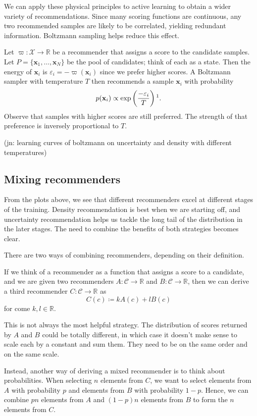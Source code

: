 \documentclass[11pt,twoside]{report}
\newcommand\bbR{\mathbb{R}}
\newcommand\bx{\mathbf{x}}
\newcommand\cC{\mathcal{C}}
\newcommand\cX{\mathcal{X}}
\newcommand\jn[1]{{\color{red}(jn: #1)}}
\begin{document}
We can apply these physical principles to active learning to obtain a wider variety of recommendations. Since many scoring functions are continuous, any two recommended samples are likely to be correlated, yielding redundant information. Boltzmann sampling helps reduce this effect.

Let $\varpi : \cX \to \bbR$ be a recommender that assigns a score to the candidate samples. Let $P = \{\bx_1, \dots, \bx_N\}$ be the pool of candidates; think of each as a state. Then the energy of $\bx_i$ is $\varepsilon_i = -\varpi(\bx_i)$ since we prefer higher scores. A Boltzmann sampler with temperature $T$ then recommends a sample $\bx_i$ with probability \[
  p(\bx_i) \propto \exp\left(\frac{-\varepsilon_i}{T}\right) \text{\footnotemark}.
\] Observe that samples with higher scores are still preferred. The strength of that preference is inversely proportional to $T$.

\jn{learning curves of boltzmann on uncertainty and density with different temperatures}

\subsection{Mixing recommenders}

From the plots above, we see that different recommenders excel at different stages of the training. Density recommendation is best when we are starting off, and uncertainty recommendation helps us tackle the long tail of the distribution in the later stages. The need to combine the benefits of both strategies becomes clear.

There are two ways of combining recommenders, depending on their definition.

If we think of a recommender as a function that assigns a score to a candidate, and we are given two recommenders $A : \cC \to \bbR$ and $B : \cC \to \bbR$, then we can derive a third recommender $C : \cC \to \bbR$ as \[
    C(c) \coloneqq kA(c) + lB(c)
\] for come $k, l \in \bbR$.

This is not always the most helpful strategy. The distribution of scores returned by $A$ and $B$ could be totally different, in which case it doesn't make sense to scale each by a constant and sum them. They need to be on the same order and on the same scale.

Instead, another way of deriving a mixed recommender is to think about probabilities. When selecting $n$ elements from $C$, we want to select elements from $A$ with probability $p$ and elements from $B$ with probability $1-p$. Hence, we can combine $pn$ elements from $A$ and $(1-p)n$ elements from $B$ to form the $n$ elements from $C$.
\end{document}
